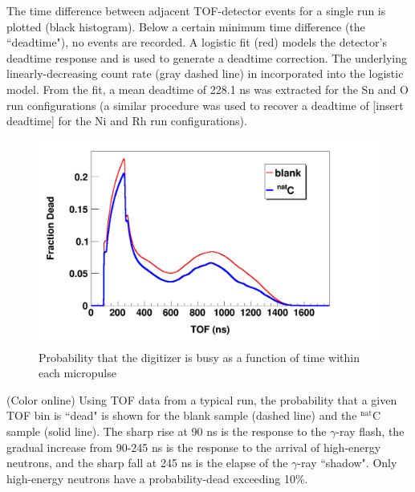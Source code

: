 The time difference between adjacent TOF-detector
    events for a single run is plotted (black histogram). Below a certain
minimum time difference (the ``deadtime"), no events are recorded. A logistic
fit (red) models the detector's deadtime response and is used to generate a
deadtime correction. The underlying linearly-decreasing count rate (gray dashed
line) in incorporated into the logistic model. From the fit, a mean deadtime of
228.1 ns was extracted for the Sn and O run configurations (a similar
procedure was used to recover a deadtime of [insert deadtime] for the Ni and Rh
run configurations).

\begin{figure}
    \includegraphics[scale=0.3]{figures/exampleDeadtimeSpectrum.png}
    \caption{Probability that the digitizer is busy as a function of time within each micropulse}
    \label{ExampleDeadtimeSpectrum}
\end{figure}

(Color online) Using TOF data from a typical run, the probability that a given 
        TOF bin is ``dead" is shown for the blank sample (dashed line) and the $^{\text{nat}}$C   
        sample (solid line). The sharp rise at 90 ns is the response to the
        $\gamma$-ray flash, the gradual increase from 90-245 ns is the response to
        the arrival of high-energy neutrons, and the sharp fall at 245 ns
        is the elapse of the $\gamma$-ray ``shadow". Only high-energy neutrons
        have a probability-dead exceeding 10\%.

